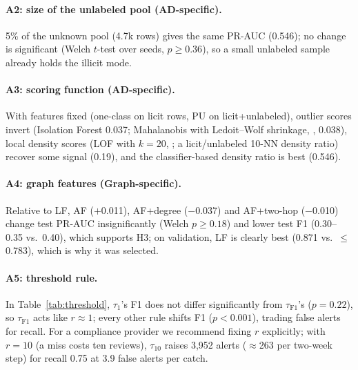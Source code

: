 \documentclass[11pt]{article}
\newcommand{\ours}{LvU}
\begin{document}
\paragraph{A2: size of the unlabeled pool (AD-specific).}
5\% of the unknown pool (4.7k rows) gives the same PR-AUC (0.546); no change is significant (Welch $t$-test over seeds, $p\ge0.36$), so a small unlabeled sample already holds the illicit mode.

\paragraph{A3: scoring function (AD-specific).}
With features fixed (one-class on licit rows, PU on licit+unlabeled), outlier scores invert (Isolation Forest 0.037; Mahalanobis with Ledoit--Wolf shrinkage, \citealp{ledoit2004shrinkage}, 0.038), local density scores (LOF with $k{=}20$, \citealp{breunig2000lof}; a licit/unlabeled 10-NN density ratio) recover some signal (0.19), and the classifier-based density ratio is best (0.546).

\paragraph{A4: graph features (Graph-specific).}
Relative to LF, AF ($+$0.011), AF+degree ($-$0.037) and AF+two-hop ($-$0.010) change test PR-AUC insignificantly (Welch $p\ge0.18$) and lower test F1 (0.30--0.35 vs.\ 0.40), which supports H3; on validation, LF is clearly best (0.871 vs.\ ${\le}$0.783), which is why it was selected.

\paragraph{A5: threshold rule.}
In Table~\ref{tab:threshold}, $\tau_1$'s F1 does not differ significantly from $\tau_{\mathrm{F1}}$'s ($p=0.22$), so $\tau_{\mathrm{F1}}$ acts like $r\approx1$; every other rule shifts F1 ($p<0.001$), trading false alerts for recall.
For a compliance provider we recommend fixing $r$ explicitly; with $r=10$ (a miss costs ten reviews), $\tau_{10}$ raises 3,952 alerts (${\approx}$263 per two-week step) for recall 0.75 at 3.9 false alerts per catch.

\begin{table}[t]
\centering\small
\setlength{\tabcolsep}{2.5pt}

\caption{Alert rules for \ours{} on the test split (15 steps), mean of 5 seeds (precision/recall std $\le$0.04); $\tau_r$ minimises $r\cdot\mathrm{FN}+\mathrm{FP}$ on validation; $p$: paired $t$-test of F1 vs.\ $\tau_{\mathrm{F1}}$.}
\label{tab:threshold}
\end{table}
\end{document}
